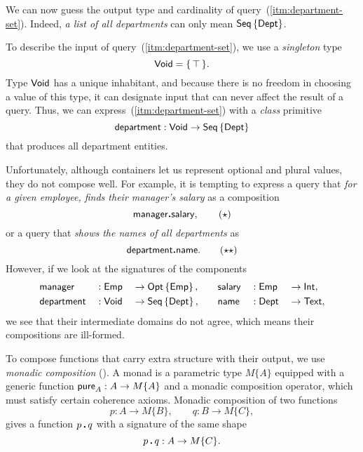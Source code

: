 We can now guess the output type and cardinality of
query~(\ref{itm:department-set}).  Indeed, \emph{a list of all departments}
can only mean $\textup{\textsf{Seq}}\left\{\textup{\textsf{Dept}}\right\}$.

To describe the input of query~(\ref{itm:department-set}), we use a
\emph{singleton} type
\begin{equation*}
    \textup{\textsf{Void}} = \{\, \top \,\}.
\end{equation*}
Type $\textup{\textsf{Void}}$ has a unique inhabitant, and because there is no freedom in
choosing a value of this type, it can designate input that can never affect the
result of a query.  Thus, we can express~(\ref{itm:department-set}) with a
\emph{class} primitive
\begin{equation*}
    \textup{\textsf{department}} : \textup{\textsf{Void}} \to \textup{\textsf{Seq}}\left\{\textup{\textsf{Dept}}\right\}
\end{equation*}
that produces all department entities.

Unfortunately, although containers let us represent optional and plural values,
they do not compose well.  For example, it is tempting to express a query that
\emph{for a given employee, finds their manager's salary} as a composition
\begin{equation} \label{eq:manager-to-salary}
    \textup{\textsf{manager}}\boldsymbol{.}\textup{\textsf{salary}}, \tag{$\star$}
\end{equation}
or a query that \emph{shows the names of all departments} as
\begin{equation} \label{eq:department-to-name}
    \textup{\textsf{department}}\boldsymbol{.}\textup{\textsf{name}}. \tag{$\star\star$}
\end{equation}
However, if we look at the signatures of the components
\begin{alignat*}{6}
    & \textup{\textsf{manager}} && : \textup{\textsf{Emp}} && \to \textup{\textsf{Opt}}\left\{\textup{\textsf{Emp}}\right\}, \quad && \textup{\textsf{salary}} && : \textup{\textsf{Emp}} && \to \textup{\textsf{Int}}, \\
    & \textup{\textsf{department}} && : \textup{\textsf{Void}} && \to \textup{\textsf{Seq}}\left\{\textup{\textsf{Dept}}\right\}, \quad && \textup{\textsf{name}} && : \textup{\textsf{Dept}} && \to \textup{\textsf{Text}},
\end{alignat*}
we see that their intermediate domains do not agree, which means their
compositions are ill-formed.

To compose functions that carry extra structure with their output, we use
\emph{monadic composition} (\cite{Moggi1991}).  A mo\-nad is a parametric type
$M\{A\}$ equipped with a generic function $\textup{\textsf{pure}}_A : A \to M\{A\}$ and
a monadic composition operator, which must satisfy certain coherence axioms.
Monadic composition of two functions
\begin{equation*}
    p : A \to M\{B\}, \qquad q : B \to M\{C\},
\end{equation*}
gives a function $p\,\boldsymbol{.}\,q$ with a signature of the same shape
\begin{equation*}
    p\,\boldsymbol{.}\,q : A \to M\{C\}.
\end{equation*}

